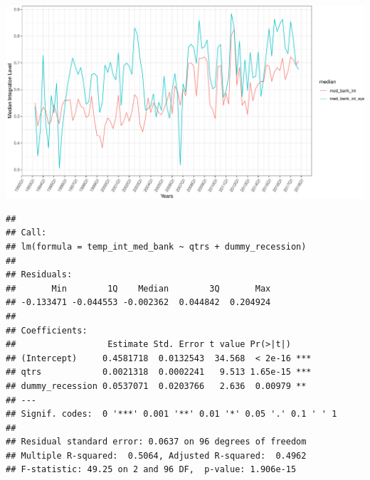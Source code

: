 \documentclass[11pt,]{article}
\begin{document}
\begin{center}\includegraphics{AC_US_Bank_Int_Results_1_files/figure-latex/systemic-1} \end{center}

\begin{verbatim}
## 
## Call:
## lm(formula = temp_int_med_bank ~ qtrs + dummy_recession)
## 
## Residuals:
##       Min        1Q    Median        3Q       Max 
## -0.133471 -0.044553 -0.002362  0.044842  0.204924 
## 
## Coefficients:
##                  Estimate Std. Error t value Pr(>|t|)    
## (Intercept)     0.4581718  0.0132543  34.568  < 2e-16 ***
## qtrs            0.0021318  0.0002241   9.513 1.65e-15 ***
## dummy_recession 0.0537071  0.0203766   2.636  0.00979 ** 
## ---
## Signif. codes:  0 '***' 0.001 '**' 0.01 '*' 0.05 '.' 0.1 ' ' 1
## 
## Residual standard error: 0.0637 on 96 degrees of freedom
## Multiple R-squared:  0.5064, Adjusted R-squared:  0.4962 
## F-statistic: 49.25 on 2 and 96 DF,  p-value: 1.906e-15
\end{verbatim}
\end{document}
